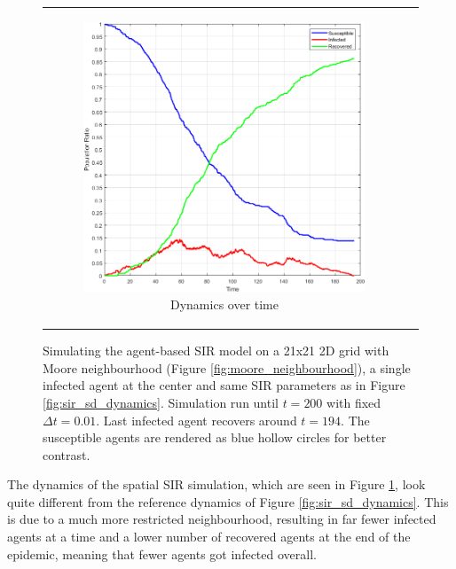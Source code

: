 \begin{figure}
\begin{center}
\begin{tabular}{c c}
		\begin{subfigure}[b]{0.43\textwidth}
			\centering
			\includegraphics[width=1\textwidth, angle=0]{./fig/timedriven/SIR_Dunai/SIR_Dunai_dt001.png}
			\caption{Dynamics over time}
			\label{fig:sir_dunai_env_dynamics}
		\end{subfigure}
	\end{tabular}
	
	\caption[Simulating the agent-based SIR model on a 21x21 2D grid with Moore neighbourhood]{Simulating the agent-based SIR model on a 21x21 2D grid with Moore neighbourhood (Figure \ref{fig:moore_neighbourhood}), a single infected agent at the center and same SIR parameters as in Figure \ref{fig:sir_sd_dynamics}. Simulation run until $t = 200$ with fixed $\Delta t = 0.01$. Last infected agent recovers around $t = 194$. The susceptible agents are rendered as blue hollow circles for better contrast.}
	\label{fig:sir_dunai}
\end{center}
\end{figure}

The dynamics of the spatial SIR simulation, which are seen in Figure \ref{fig:sir_dunai_env_dynamics}, look quite different from the reference dynamics of Figure \ref{fig:sir_sd_dynamics}. This is due to a much more restricted neighbourhood, resulting in far fewer infected agents at a time and a lower number of recovered agents at the end of the epidemic, meaning that fewer agents got infected overall.

